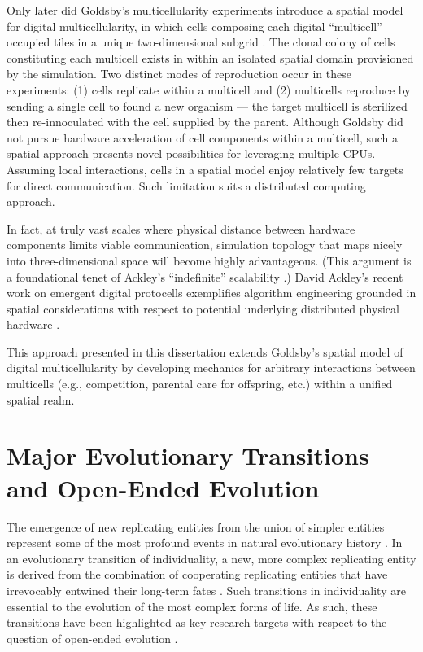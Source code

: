 Only later did Goldsby's multicellularity experiments introduce a spatial model for digital multicellularity, in which cells composing each digital ``multicell'' occupied tiles in a unique two-dimensional subgrid \citep{goldsby2014evolutionary}.
The clonal colony of cells constituting each multicell exists in within an isolated spatial domain provisioned by the simulation.
Two distinct modes of reproduction occur in these experiments:
(1) cells replicate within a multicell and
(2) multicells reproduce by sending a single cell to found a new organism --- the target multicell is sterilized then re-innoculated with the cell supplied by the parent.
Although Goldsby did not pursue hardware acceleration of cell components within a multicell, such a spatial approach presents novel possibilities for leveraging multiple CPUs.
Assuming local interactions, cells in a spatial model enjoy relatively few targets for direct communication.
Such limitation suits a distributed computing approach.

In fact, at truly vast scales where physical distance between hardware components limits viable communication, simulation topology that maps nicely into three-dimensional space will become highly advantageous.
(This argument is a foundational tenet of Ackley's ``indefinite'' scalability \citep{ackley2011pursue}.)
David Ackley's recent work on emergent digital protocells exemplifies algorithm engineering grounded in spatial considerations with respect to potential underlying distributed physical hardware \citep{ackley2018digital,ackley2019building}.

This approach presented in this dissertation extends Goldsby's spatial model of digital multicellularity by developing mechanics for arbitrary interactions between multicells (e.g., competition, parental care for offspring, etc.) within a unified spatial realm.

\section{Major Evolutionary Transitions and Open-Ended Evolution}

The emergence of new replicating entities from the union of simpler entities represent some of the most profound events in natural evolutionary history \citep{smith1997major}.
In an evolutionary transition of individuality, a new, more complex replicating entity is derived from the combination of cooperating replicating entities that have irrevocably entwined their long-term fates \citep{west2015major}.
Such transitions in individuality are essential to the evolution of the most complex forms of life.
As such, these transitions have been highlighted as key research targets with respect to the question of open-ended evolution \citep{ray1996evolving, banzhaf2016defining}.

